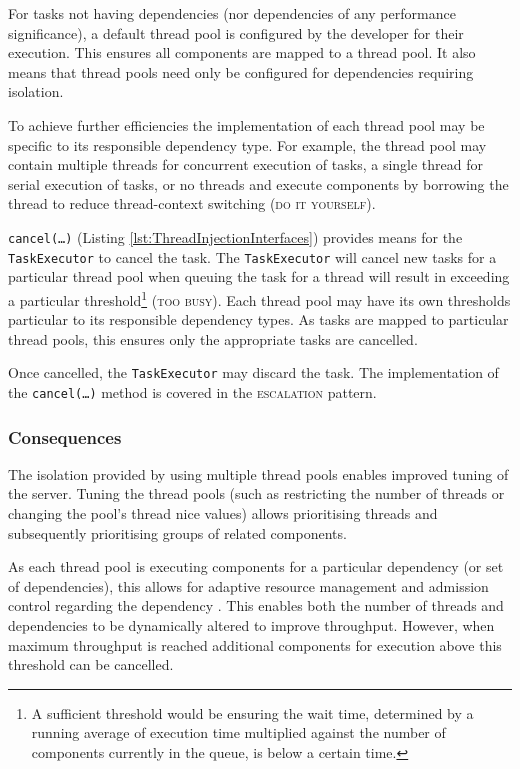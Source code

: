 \documentclass[prodmode]{style/acmlarge}
\begin{document}
For tasks not having dependencies (nor dependencies of any performance
significance), a default thread pool is configured by the developer for their
execution.  This ensures all components are mapped to a thread pool.  It also
means that thread pools need only be configured for dependencies requiring
isolation.

To achieve further efficiencies the implementation of each thread pool may be
specific to its responsible dependency type.  For example, the thread pool may
contain multiple threads for concurrent execution of tasks, a single thread for
serial execution of tasks, or no threads and execute components by borrowing the
thread to reduce thread-context switching (\textsc{do it yourself}).

\texttt{cancel(\ldots)} (Listing \ref{lst:ThreadInjectionInterfaces}) provides
means for the \texttt{TaskExecutor} to cancel the task.
The \texttt{TaskExecutor} will cancel new tasks for a particular thread pool
when queuing the task for a thread will result in exceeding a particular
threshold\footnote{A sufficient threshold would be ensuring the wait time,
determined by a running average of execution time multiplied against the number
of components currently in the queue, is below a certain time.} (\textsc{too
busy}).  Each thread pool may have its own thresholds particular to its
responsible dependency types.  As tasks are mapped to particular thread
pools, this ensures only the appropriate tasks are cancelled.

Once cancelled, the \texttt{TaskExecutor} may discard the task.  The
implementation of the \texttt{can\-cel(\ldots)} method is covered in the
\textsc{escalation} pattern.


\subsubsection*{Consequences}

The isolation provided by using multiple thread pools enables improved tuning of
the server.  Tuning the thread pools (such as restricting the number of threads
or changing the pool's thread nice values) allows prioritising threads and
subsequently prioritising groups of related components.

As each thread pool is executing components for a particular dependency (or set
of dependencies), this allows for adaptive resource management and admission
control regarding the dependency \cite{seda}.  This enables both the number of
threads and dependencies to be dynamically altered to improve throughput.
However, when maximum throughput is reached additional components for execution
above this threshold can be cancelled.
\end{document}
